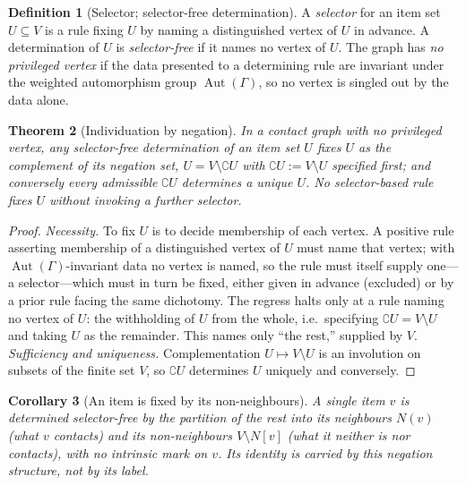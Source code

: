 \documentclass[11pt,twocolumn,a4paper]{article}
\theoremstyle{thmstyle}
\newtheorem{theorem}{Theorem}[section]
\newtheorem{corollary}[theorem]{Corollary}
\theoremstyle{definition}
\newtheorem{definition}[theorem]{Definition}
\theoremstyle{remark}
\newcommand{\Gph}{\Gamma}
\newcommand{\V}{V}
\newcommand{\co}{\complement}
\begin{document}
\begin{definition}[Selector; selector-free determination]
\label{def:selector}
A \emph{selector} for an item set $U\subseteq\V$ is a rule fixing $U$ by
naming a distinguished vertex of $U$ in advance. A determination of $U$ is
\emph{selector-free} if it names no vertex of $U$. The graph has \emph{no
privileged vertex} if the data presented to a determining rule are
invariant under the weighted automorphism group $\operatorname{Aut}(\Gph)$,
so no vertex is singled out by the data alone.
\end{definition}

\begin{theorem}[Individuation by negation]
\label{thm:negation}
In a contact graph with no privileged vertex, any selector-free
determination of an item set $U$ fixes $U$ as the complement of its
negation set, $U=\V\setminus\co U$ with $\co U:=\V\setminus U$ specified
first; and conversely every admissible $\co U$ determines a unique $U$. No
selector-based rule fixes $U$ without invoking a further selector.
\end{theorem}

\begin{proof}
\emph{Necessity.} To fix $U$ is to decide membership of each vertex. A
positive rule asserting membership of a distinguished vertex of $U$ must
name that vertex; with $\operatorname{Aut}(\Gph)$-invariant data no vertex
is named, so the rule must itself supply one---a selector---which must in
turn be fixed, either given in advance (excluded) or by a prior rule
facing the same dichotomy. The regress halts only at a rule naming no
vertex of $U$: the withholding of $U$ from the whole, i.e.\ specifying
$\co U=\V\setminus U$ and taking $U$ as the remainder. This names only
``the rest,'' supplied by $\V$. \emph{Sufficiency and uniqueness.}
Complementation $U\mapsto\V\setminus U$ is an involution on subsets of the
finite set $\V$, so $\co U$ determines $U$ uniquely and conversely.
\end{proof}

\begin{corollary}[An item is fixed by its non-neighbours]
\label{cor:vertex-negation}
A single item $v$ is determined selector-free by the partition of the rest
into its neighbours $N(v)$ (what $v$ contacts) and its non-neighbours
$\V\setminus N[v]$ (what it neither is nor contacts), with no intrinsic
mark on $v$. Its identity is carried by this negation structure, not by
its label.
\end{corollary}
\end{document}

